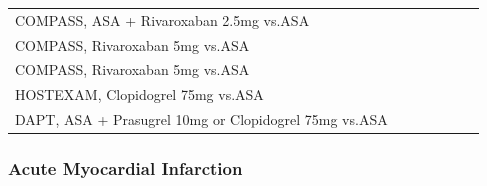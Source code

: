 \documentclass[
  12pt,
]{article}
\begin{document}
\begin{table}[!h]
{\begin{tabular}[t]{lllllll}
COMPASS, ASA + Rivaroxaban 2.5mg vs.ASA & \cellcolor[HTML]{5CA881}{\textcolor{white}{Low}} & \cellcolor[HTML]{5CA881}{\textcolor{white}{Low}} & \cellcolor[HTML]{5CA881}{\textcolor{white}{Low}} & \cellcolor[HTML]{E7B03C}{\textcolor{white}{Some concerns}} & \cellcolor[HTML]{5CA881}{\textcolor{white}{Low}} & \cellcolor[HTML]{E7B03C}{\textcolor{white}{Some concerns}}\\
COMPASS, Rivaroxaban 5mg vs.ASA & \cellcolor[HTML]{5CA881}{\textcolor{white}{Low}} & \cellcolor[HTML]{5CA881}{\textcolor{white}{Low}} & \cellcolor[HTML]{5CA881}{\textcolor{white}{Low}} & \cellcolor[HTML]{5CA881}{\textcolor{white}{Low}} & \cellcolor[HTML]{5CA881}{\textcolor{white}{Low}} & \cellcolor[HTML]{5CA881}{\textcolor{white}{Low}}\\
COMPASS, Rivaroxaban 5mg vs.ASA & \cellcolor[HTML]{5CA881}{\textcolor{white}{Low}} & \cellcolor[HTML]{5CA881}{\textcolor{white}{Low}} & \cellcolor[HTML]{5CA881}{\textcolor{white}{Low}} & \cellcolor[HTML]{E7B03C}{\textcolor{white}{Some concerns}} & \cellcolor[HTML]{5CA881}{\textcolor{white}{Low}} & \cellcolor[HTML]{E7B03C}{\textcolor{white}{Some concerns}}\\
HOSTEXAM, Clopidogrel 75mg vs.ASA & \cellcolor[HTML]{5CA881}{\textcolor{white}{Low}} & \cellcolor[HTML]{5CA881}{\textcolor{white}{Low}} & \cellcolor[HTML]{5CA881}{\textcolor{white}{Low}} & \cellcolor[HTML]{5CA881}{\textcolor{white}{Low}} & \cellcolor[HTML]{5CA881}{\textcolor{white}{Low}} & \cellcolor[HTML]{5CA881}{\textcolor{white}{Low}}\\
\addlinespace
DAPT, ASA + Prasugrel 10mg or Clopidogrel 75mg vs.ASA & \cellcolor[HTML]{5CA881}{\textcolor{white}{Low}} & \cellcolor[HTML]{5CA881}{\textcolor{white}{Low}} & \cellcolor[HTML]{5CA881}{\textcolor{white}{Low}} & \cellcolor[HTML]{5CA881}{\textcolor{white}{Low}} & \cellcolor[HTML]{5CA881}{\textcolor{white}{Low}} & \cellcolor[HTML]{5CA881}{\textcolor{white}{Low}}\\
\bottomrule
\end{tabular}}
\end{table}

\newpage

\hypertarget{acute-myocardial-infarction}{%
\subsubsection{Acute Myocardial
Infarction}\label{acute-myocardial-infarction}}
\end{document}
